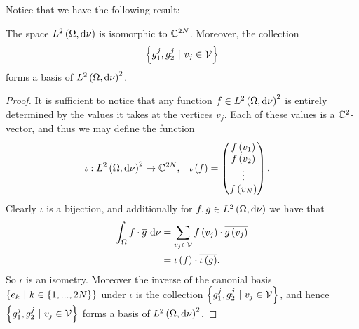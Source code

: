 Notice that we have the following result:
\begin{lemma}
	The space $L^{2}\left( \Omega,\mathrm{d}\nu \right)$ is isomorphic to $\mathbb{C}^{2N}$.
	Moreover, the collection 
	\begin{align*}
		\left\{ g_1^j, g_2^j \ \vert \ v_j\in\mathcal{V} \right\}
	\end{align*}
	forms a basis of $L^{2}\left( \Omega,\mathrm{d}\nu \right)^2$.
\end{lemma}
\begin{proof}
	It is sufficient to notice that any function $f\in L^{2}\left( \Omega,\mathrm{d}\nu \right)^2$ is entirely determined by the values it takes at the vertices $v_j$.
	Each of these values is a $\mathbb{C}^2$-vector, and thus we may define the function
	\begin{align*}
		\iota:L^{2}\left( \Omega,\mathrm{d}\nu \right)^2 \rightarrow\mathbb{C}^{2N}, &\quad
		\iota\left( f \right) = \begin{pmatrix} f\left( v_1 \right) \\ f\left( v_2 \right) \\ \vdots \\ f\left( v_N \right) \end{pmatrix}.
	\end{align*}
	Clearly $\iota$ is a bijection, and additionally for $f,g\in L^{2}\left( \Omega,\mathrm{d}\nu \right)$ we have that
	\begin{align*}
		\int_{\Omega}f\cdot \overline{g} \ \mathrm{d}\nu &= \sum_{v_j\in\mathcal{V}} f\left( v_j \right)\cdot\overline{g\left( v_j \right)} \\
		&= \iota\left( f \right)\cdot\overline{\iota\left( g \right)}.
	\end{align*}
	So $\iota$ is an isometry.
	Moreover the inverse of the canonial basis $\clbracs{e_k \ \vert \ k\in\clbracs{1,...,2N}}$ under $\iota$ is the collection $\clbracs{g_1^j, g_2^j \ \vert \ v_j\in\vertSet}$, and hence $\clbracs{g_1^j, g_2^j \ \vert \ v_j\in\vertSet}$ forms a basis of $L^{2}\left( \Omega,\mathrm{d}\nu \right)^2$.
\end{proof}

